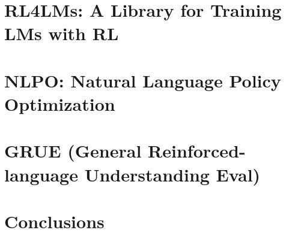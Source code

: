 \section{RL4LMs: A Library for Training LMs with RL} \label{sec:main/30_framework} 
\section{NLPO: Natural Language Policy Optimization} \label{sec:main/40_nlpo} 
\section{GRUE (General Reinforced-language Understanding Eval)} \label{sec:main/50_evaluation} 
\section{Conclusions} \label{sec:main/60_conclusion} 


